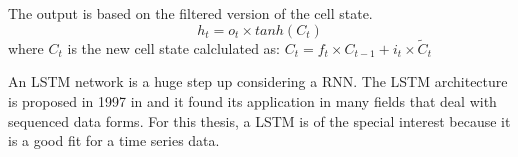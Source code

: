 \begin{itemize}
	The output is based on the filtered version of the cell state.
	$$ h_{t} = o_{t} \times tanh(C_{t})$$
	where 
	$ C_{t} $ is the new cell state calclulated as:
	$ C_{t} = f_{t} \times C_{t-1} + i_{t} \times \tilde{C}_{t} $
\end{itemize}

An LSTM network is a huge step up considering a RNN. 
The LSTM architecture is proposed in 1997 in \cite{Hochreiter_LSTM} and it found its application in many fields that deal with sequenced data forms.
For this thesis, a LSTM is of the special interest because it is a good fit for a time series data. 

